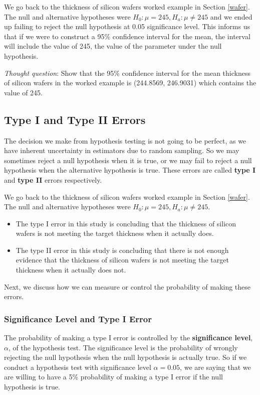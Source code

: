 \documentclass[
]{book}
\begin{document}
We go back to the thickness of silicon wafers worked example in Section \ref{wafer}. The null and alternative hypotheses were \(H_0: \mu = 245, H_a: \mu \neq 245\) and we ended up failing to reject the null hypothesis at 0.05 significance level. This informs us that if we were to construct a 95\% confidence interval for the mean, the interval will include the value of 245, the value of the parameter under the null hypothesis.

\emph{Thought question}: Show that the 95\% confidence interval for the mean thickness of silicon wafers in the worked example is (244.8569, 246.9031) which contains the value of 245.

\subsection{Type I and Type II Errors}\label{type-i-and-type-ii-errors}

The decision we make from hypothesis testing is not going to be perfect, as we have inherent uncertainty in estimators due to random sampling. So we may sometimes reject a null hypothesis when it is true, or we may fail to reject a null hypothesis when the alternative hypothesis is true. These errors are called \textbf{type I} and \textbf{type II} errors respectively.

We go back to the thickness of silicon wafers worked example in Section \ref{wafer}. The null and alternative hypotheses were \(H_0: \mu = 245, H_a: \mu \neq 245\).

\begin{itemize}
\item
  The type I error in this study is concluding that the thickness of silicon wafers is not meeting the target thickness when it actually does.
\item
  The type II error in this study is concluding that there is not enough evidence that the thickness of silicon wafers is not meeting the target thickness when it actually does not.
\end{itemize}

Next, we discuss how we can measure or control the probability of making these errors.

\subsubsection{Significance Level and Type I Error}\label{significance-level-and-type-i-error}

The probability of making a type I error is controlled by the \textbf{significance level}, \(\alpha\), of the hypothesis test. The significance level is the probability of wrongly rejecting the null hypothesis when the null hypothesis is actually true. So if we conduct a hypothesis test with significance level \(\alpha = 0.05\), we are saying that we are willing to have a 5\% probability of making a type I error if the null hypothesis is true.
\end{document}
